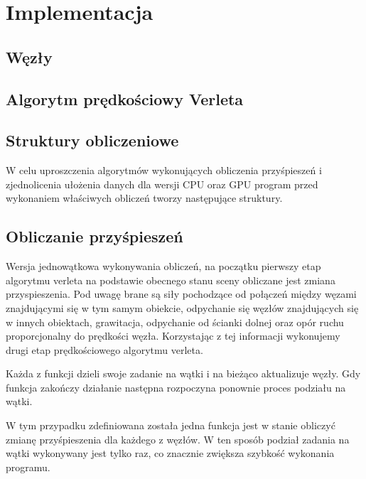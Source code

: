 \documentclass[12pt, letterpaper]{report}
\begin{document}
\chapter{Implementacja}
    \section{Węzły}
    

    \section{Algorytm prędkościowy Verleta}
    

    \section{Struktury obliczeniowe}
    W celu uproszczenia algorytmów wykonujących obliczenia przyśpieszeń i zjednolicenia 
    ułożenia danych dla wersji CPU oraz GPU program przed wykonaniem właściwych obliczeń
    tworzy następujące struktury.

    \section{Obliczanie przyśpieszeń}
    
    Wersja jednowątkowa wykonywania obliczeń, na początku pierwszy etap algorytmu verleta na podstawie 
    obecnego stanu sceny obliczane jest zmiana przyspieszenia. 
    Pod uwagę brane są siły pochodzące od połączeń między 
    węzami znajdującymi się w tym samym obiekcie, odpychanie się węzłów znajdujących się w innych obiektach, 
    grawitacja, odpychanie od ścianki dolnej oraz opór ruchu proporcjonalny do prędkości węzła.
    Korzystając z tej informacji wykonujemy drugi etap prędkościowego algorytmu verleta.

    
    Każda z funkcji dzieli swoje zadanie na wątki i na bieżąco aktualizuje węzły. Gdy funkcja 
    zakończy działanie następna rozpoczyna ponownie proces podziału na wątki.

    
    W tym przypadku zdefiniowana została jedna funkcja jest w stanie obliczyć zmianę przyśpieszenia 
    dla każdego z węzłów. W ten sposób podział zadania na wątki wykonywany jest tylko raz, co 
    znacznie zwiększa szybkość wykonania programu.
    
\end{document}
